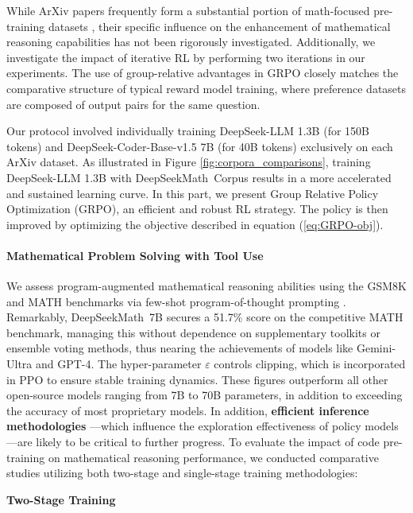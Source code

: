 {\begin{itemize}[topsep=0pt]
\begin{itemize}[topsep=0pt]
\begin{itemize}[topsep=0pt]
\begin{itemize}[topsep=0pt]
While ArXiv papers frequently form a substantial portion of math-focused pre-training datasets \citep{minerva,gpt-f,llemma,mathpile}, their specific influence on the enhancement of mathematical reasoning capabilities has not been rigorously investigated. Additionally, we investigate the impact of iterative RL by performing two iterations in our experiments. The use of group-relative advantages in GRPO closely matches the comparative structure of typical reward model training, where preference datasets are composed of output pairs for the same question. \end{itemize}

Our protocol involved individually training DeepSeek-LLM 1.3B (for 150B tokens) and DeepSeek-Coder-Base-v1.5 7B (for 40B tokens) exclusively on each ArXiv dataset. As illustrated in Figure \ref{fig:corpora_comparisons}, training DeepSeek-LLM 1.3B with DeepSeekMath~Corpus results in a more accelerated and sustained learning curve. In this part, we present Group Relative Policy Optimization (GRPO), an efficient and robust RL strategy. The policy is then improved by optimizing the objective described in equation (\ref{eq:GRPO-obj}). \paragraph{Mathematical Problem Solving with Tool Use} 
We assess program-augmented mathematical reasoning abilities using the GSM8K and MATH benchmarks via few-shot program-of-thought prompting \citep{pot,pal}. Remarkably, DeepSeekMath~7B secures a 51.7\% score on the competitive MATH benchmark, managing this without dependence on supplementary toolkits or ensemble voting methods, thus nearing the achievements of models like Gemini-Ultra and GPT-4. The hyper-parameter $\varepsilon$ controls clipping, which is incorporated in PPO to ensure stable training dynamics. These figures outperform all other open-source models ranging from 7B to 70B parameters, in addition to exceeding the accuracy of most proprietary models. In addition, \textbf{efficient inference methodologies} \citep{xia-etal-2023-speculative,leviathan2023fast,kwon2023efficient,xia2024unlocking}—which influence the exploration effectiveness of policy models—are likely to be critical to further progress. To evaluate the impact of code pre-training on mathematical reasoning performance, we conducted comparative studies utilizing both two-stage and single-stage training methodologies:

\textbf{Two-Stage Training}


\end{itemize}
\end{itemize}
\end{itemize}}
